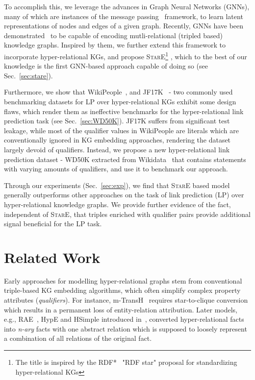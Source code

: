 \documentclass[11pt,a4paper]{article}
\begin{document}
To accomplish this, we leverage the advances in Graph Neural Networks (GNNs), many of which are instances of the message passing~\citep{DBLP:conf/icml/GilmerSRVD17} framework, to learn latent representations of nodes and edges of a given graph. Recently, GNNs have been demonstrated~\citep{Vashishth2020Composition-based} to be capable of encoding mutli-relational (tripled based) knowledge graphs. Inspired by them, we further extend this framework to incorporate hyper-relational KGs, and propose \textsc{StarE}\footnote{The title is inspired by the RDF*~\citep{DBLP:conf/amw/Hartig17} "RDF star" proposal for standardizing hyper-relational KGs} , which to the best of our knowledge is the first GNN-based approach capable of doing so (see Sec.~\ref{sec:stare}).





Furthermore, we show that WikiPeople~\citep{DBLP:conf/www/GuanJWC19}, and JF17K~\citep{DBLP:conf/ijcai/WenLMCZ16} - two commonly used benchmarking datasets for LP over hyper-relational KGs exhibit some design flaws, which render them as ineffective benchmarks for the hyper-relational link prediction task (see Sec.~\ref{sec:WD50K}).
JF17K suffers from significant test leakage, while most of the qualifier values in WikiPeople are literals which are conventionally ignored in KG embedding approaches, rendering the dataset largely devoid of qualifiers.
Instead, we propose a new hyper-relational link prediction dataset - WD50K extracted from Wikidata~\citep{DBLP:journals/cacm/VrandecicK14} that contains statements with varying amounts of qualifiers, and use it to benchmark our approach.




Through our experiments (Sec.~\ref{sec:exp}), we find that \textsc{StarE} based model generally outperforms other approaches on the task of link prediction (LP) over hyper-relational knowledge graphs.
We provide further evidence of the fact, independent of \textsc{StarE}, that triples enriched with qualifier pairs provide additional signal beneficial for the LP task. 



\section{Related Work}





Early approaches for modelling hyper-relational graphs stem from conventional triple-based KG embedding algorithms, which often simplify complex property attributes (\emph{qualifiers}). 
For instance, m-TransH~\citep{DBLP:conf/ijcai/WenLMCZ16} requires star-to-clique conversion which results in a permanent loss of entity-relation attribution. 
Later models, e.g., RAE~\citep{DBLP:conf/www/ZhangLMM18}, HypE and HSimple introduced in~\cite{ijcai2020-303}, converted hyper-relational facts into \emph{n-ary} facts with one abstract relation 
which is supposed to loosely represent a combination of all relations of the original fact. 
\end{document}
